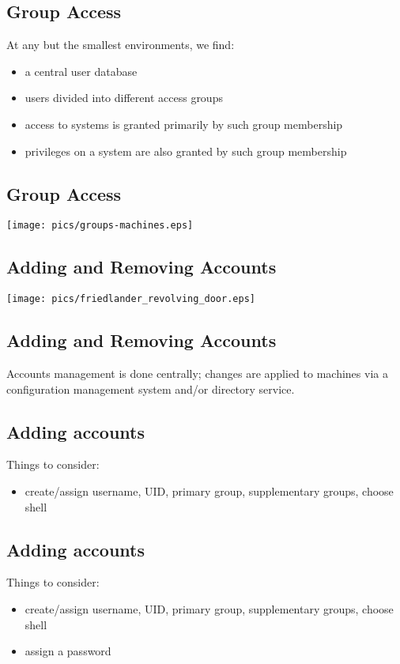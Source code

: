 \documentclass[xga]{xdvislides}
\begin{document}
\subsection{Group Access}
At any but the smallest environments, we find:
\begin{itemize}
	\item a central user database
	\item users divided into different access groups
	\item access to systems is granted primarily by such group membership
	\item privileges on a system are also granted by such group membership
\end{itemize}

\subsection{Group Access}
\begin{center}
	\texttt{[image: pics/groups-machines.eps]}
\end{center}


\subsection{Adding and Removing Accounts}
\begin{center}
	\texttt{[image: pics/friedlander\_revolving\_door.eps]}
\end{center}

\subsection{Adding and Removing Accounts}
\vfill
Accounts management is done centrally; changes are applied to machines via a
configuration management system and/or directory service.
\vfill

\subsection{Adding accounts}
Things to consider:
\begin{itemize}
	\item create/assign username, UID, primary group, supplementary groups,
		choose shell
\end{itemize}

\subsection{Adding accounts}
Things to consider:
\begin{itemize}
	\item create/assign username, UID, primary group, supplementary groups,
		choose shell
	\item assign a password
\end{itemize}
\end{document}
